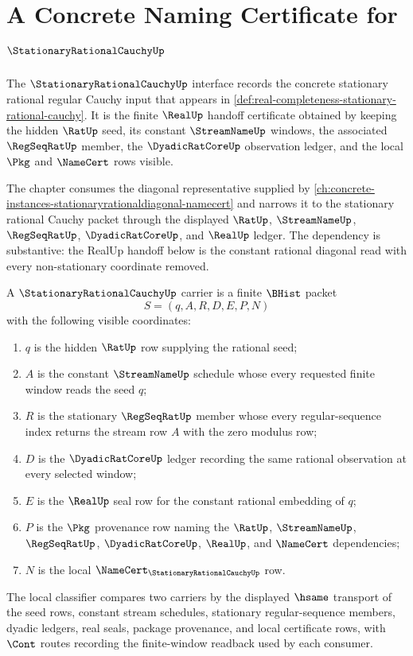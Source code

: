 \chapter{A Concrete Naming Certificate for $\StationaryRationalCauchyUp$}
\label{ch:concrete-instances-stationary-rational-cauchy-namecert}

The $\StationaryRationalCauchyUp$ interface records the concrete stationary rational regular Cauchy input that appears in \autoref{def:real-completeness-stationary-rational-cauchy}. It is the finite $\RealUp$ handoff certificate obtained by keeping the hidden $\RatUp$ seed, its constant $\StreamNameUp$ windows, the associated $\RegSeqRatUp$ member, the $\DyadicRatCoreUp$ observation ledger, and the local $\Pkg$ and $\NameCert$ rows visible.

The chapter consumes the diagonal representative supplied by \autoref{ch:concrete-instances-stationaryrationaldiagonal-namecert} and narrows it to the stationary rational Cauchy packet through the displayed $\RatUp$, $\StreamNameUp$, $\RegSeqRatUp$, $\DyadicRatCoreUp$, and $\RealUp$ ledger. The dependency is substantive: the RealUp handoff below is the constant rational diagonal read with every non-stationary coordinate removed.

\begin{definition}
\label{def:stationary-rational-cauchy-carrier}
A $\StationaryRationalCauchyUp$ carrier is a finite $\BHist$ packet
$$
S=(q,A,R,D,E,P,N)
$$
with the following visible coordinates:
\begin{enumerate}
\item $q$ is the hidden $\RatUp$ row supplying the rational seed;
\item $A$ is the constant $\StreamNameUp$ schedule whose every requested finite window reads the seed $q$;
\item $R$ is the stationary $\RegSeqRatUp$ member whose every regular-sequence index returns the stream row $A$ with the zero modulus row;
\item $D$ is the $\DyadicRatCoreUp$ ledger recording the same rational observation at every selected window;
\item $E$ is the $\RealUp$ seal row for the constant rational embedding of $q$;
\item $P$ is the $\Pkg$ provenance row naming the $\RatUp$, $\StreamNameUp$, $\RegSeqRatUp$, $\DyadicRatCoreUp$, $\RealUp$, and $\NameCert$ dependencies;
\item $N$ is the local $\NameCert_{\StationaryRationalCauchyUp}$ row.
\end{enumerate}
The local classifier compares two carriers by the displayed $\hsame$ transport of the seed rows, constant stream schedules, stationary regular-sequence members, dyadic ledgers, real seals, package provenance, and local certificate rows, with $\Cont$ routes recording the finite-window readback used by each consumer.
\end{definition}

